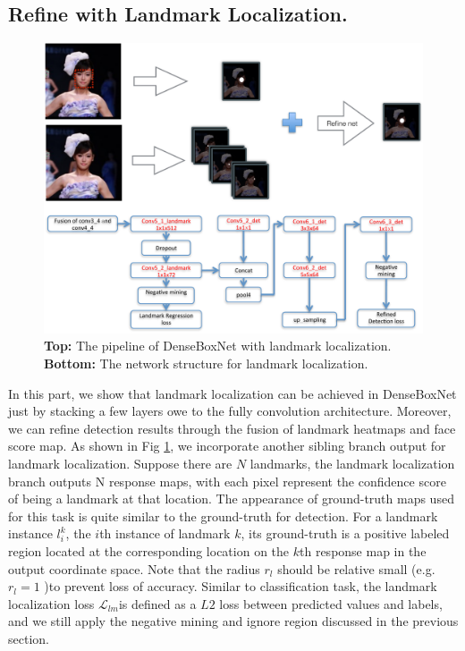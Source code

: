 \subsection{Refine with Landmark Localization.} 
	\begin{figure}[!hbtp]
	\centering
	 \includegraphics[scale=0.45]{figures/figure4-crop.pdf}
	\caption{\textbf{Top: } The pipeline of DenseBoxNet with landmark localization. \textbf{Bottom: } The network structure for landmark localization. }
	\label{fig:fig_refine}
	\end{figure}
In this part, we show that landmark localization can be achieved in DenseBoxNet just by stacking a few layers owe to the fully convolution architecture. Moreover, we can refine detection results through the fusion of landmark heatmaps and face score map. As shown in Fig \ref{fig:fig_refine},  we incorporate another sibling branch output for landmark localization. Suppose there are $N$ landmarks, the landmark localization branch outputs N response maps, with each pixel represent the confidence score of being a landmark at that location.  The appearance of ground-truth maps used for this task is quite similar to the ground-truth for detection.  For a landmark instance $l^k_i$, the $i$th instance of landmark $k$, its ground-truth is a positive labeled region located at the corresponding location on the $k$th response map in the output coordinate space.  Note that the radius $r_l$ should be relative small (e.g. $r_l = 1$  )to prevent loss of accuracy.   Similar to classification task, the landmark localization loss $\mathcal{L} _{lm}$is defined as a $L2$ loss between predicted values and labels, and we still apply the negative mining and ignore region discussed in the previous section. 

